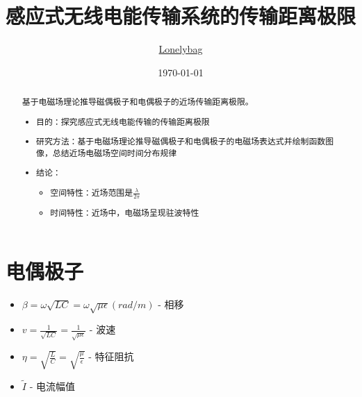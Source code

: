 \documentclass[lang=cn,11pt]{elegantpaper}
\title{感应式无线电能传输系统的传输距离极限}
\author{\href{https://gitee.com/lonelybag/personal-doc/}{Lonelybag}}
\date{\today}
\begin{document}
\maketitle

\begin{abstract}
  基于电磁场理论推导磁偶极子和电偶极子的近场传输距离极限。
  \begin{itemize}
    \item 目的：探究感应式无线电能传输的传输距离极限
    \item 研究方法：基于电磁场理论推导磁偶极子和电偶极子的电磁场表达式并绘制函数图像，总结近场电磁场空间时间分布规律
    \item 结论：
    \begin{itemize}
      \item 空间特性：近场范围是$\frac{\lambda}{2\pi}$
      \item 时间特性：近场中，电磁场呈现驻波特性
    \end{itemize}
  \end{itemize}

\end{abstract}

\section{电偶极子}
\begin{itemize}
  \item $\beta=\omega\sqrt{LC}=\omega\sqrt{\mu\epsilon}(rad/m)$ - 相移
  \item $v=\frac{1}{\sqrt{LC}}=\frac{1}{\sqrt{\mu \epsilon}}$ - 波速
  \item $\eta=\sqrt{\frac{L}{C}}=\sqrt{\frac{\mu}{\epsilon}}$ - 特征阻抗
  \item $\widetilde{I}$ - 电流幅值
\end{itemize}
\end{document}

